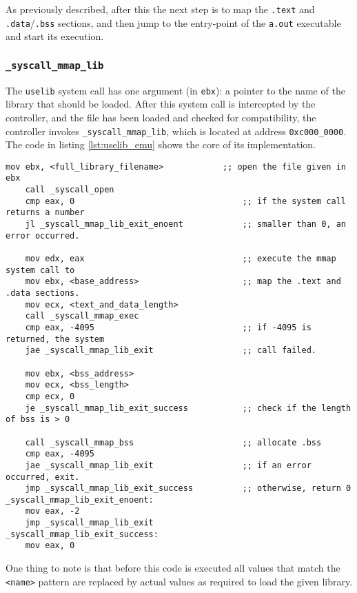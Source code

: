 \documentclass{article}
\begin{document}
As previously described, after this the next step is to map the \texttt{.text} and \texttt{.data}/\texttt{.bss} sections, and then jump to the entry-point of the \texttt{a.out} executable and start its execution.

\subsubsection{\texttt{\_syscall\_mmap\_lib}}

The \texttt{uselib} system call has one argument (in \texttt{ebx}\cite{SyscallRef}): a pointer to the name of the library that should be loaded. After this system call is intercepted by the controller, and the file has been loaded and checked for compatibility, the controller invokes \texttt{\_syscall\_mmap\_lib}, which is located at address \texttt{0xc000\_0000}. The code in listing \ref{lst:uselib_emu} shows the core of its implementation.

\begin{lstlisting}[language={[x86masm]Assembler}, caption={Assembly used to emulate the behavior of a \texttt{uselib} system call.}, label={lst:uselib_emu}]
    mov ebx, <full_library_filename>            ;; open the file given in ebx
    call _syscall_open
    cmp eax, 0                                  ;; if the system call returns a number
    jl _syscall_mmap_lib_exit_enoent            ;; smaller than 0, an error occurred.

    mov edx, eax                                ;; execute the mmap system call to
    mov ebx, <base_address>                     ;; map the .text and .data sections.
    mov ecx, <text_and_data_length>
    call _syscall_mmap_exec
    cmp eax, -4095                              ;; if -4095 is returned, the system
    jae _syscall_mmap_lib_exit                  ;; call failed.

    mov ebx, <bss_address>
    mov ecx, <bss_length>
    cmp ecx, 0
    je _syscall_mmap_lib_exit_success           ;; check if the length of bss is > 0

    call _syscall_mmap_bss                      ;; allocate .bss
    cmp eax, -4095
    jae _syscall_mmap_lib_exit                  ;; if an error occurred, exit.
    jmp _syscall_mmap_lib_exit_success          ;; otherwise, return 0
_syscall_mmap_lib_exit_enoent:
    mov eax, -2
    jmp _syscall_mmap_lib_exit
_syscall_mmap_lib_exit_success:
    mov eax, 0
\end{lstlisting}

One thing to note is that before this code is executed all values that match the \texttt{<name>} pattern are replaced by actual values as required to load the given library.
\end{document}

